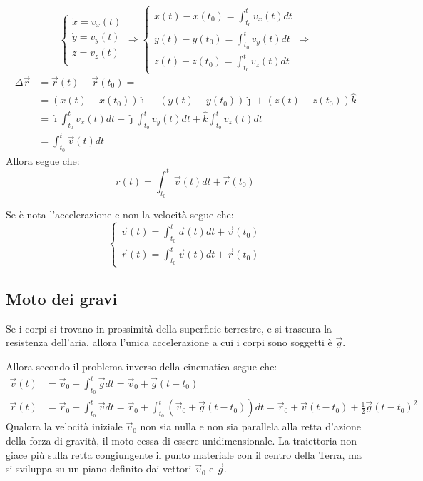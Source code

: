 \documentclass[11pt, a4paper, openright]{book}
\theoremstyle{plain}
\theoremstyle{definition}
\begin{document}
\[\begin{cases}
    \dot{x} = v_x(t) \\
    \dot{y} = v_y(t) \\
    \dot{z} = v_z(t) \\
\end{cases} \Rightarrow \begin{cases}
    \displaystyle x(t) - x(t_0) = \int_{t_0}^t v_x(t) dt \\[1em]
    \displaystyle y(t) - y(t_0) = \int_{t_0}^t v_y(t) dt \\[1em]
    \displaystyle z(t) - z(t_0) = \int_{t_0}^t v_z(t) dt 
\end{cases} \Rightarrow \]
\begin{align}
    \Delta \vec{r} & = \vec{r}(t) - \vec{r}(t_0) = \\
    & = (x(t) - x(t_0))\hat{\imath} + (y(t) - y(t_0))\hat{\jmath} + (z(t) - z(t_0))\hat{k} \\
    & = \hat{\imath}\int_{t_0}^t v_x(t)dt +  \hat{\jmath}\int_{t_0}^t v_y(t)dt + \hat{k}\int_{t_0}^t v_z(t)dt \\
    & = \int_{t_0}^t \vec{v}(t) dt
\end{align}
Allora segue che:
\[r(t) = \int_{t_0}^t \vec{v}(t) dt + \vec{r}(t_0)\]

Se è nota l'accelerazione e non la velocità segue che:
\[
\begin{cases}
    \vec{v}(t) = \displaystyle \int_{t_0}^t \vec{a}(t) dt + \vec{v}(t_0) \\[1em]
    
    \vec{r}(t) = \displaystyle \int_{t_0}^t \vec{v}(t) dt + \vec{r}(t_0)
\end{cases}
\]

\newpage
\subsection{Moto dei gravi}
Se i corpi si trovano in prossimità della superficie terrestre, e si trascura la resistenza dell'aria, allora l'unica accelerazione a cui i corpi sono soggetti è $\vec{g}$.

Allora secondo il problema inverso della cinematica segue che:
\begin{align}
    \vec{v}(t) & = \vec{v}_0 + \int_{t_0}^t \vec{g} dt = \vec{v}_0 + \vec{g}(t - t_0) \\
    \vec{r}(t) & = \vec{r}_0 + \int_{t_0}^t \vec{v} dt = \vec{r}_0 + \int_{t_0}^t (\vec{v}_0 + \vec{g}(t - t_0)) dt = \vec{r}_0 + \vec{v}(t - t_0) + \frac{1}{2}\vec{g}(t - t_0)^2
\end{align}
Qualora la velocità iniziale $\vec{v}_0$ non sia nulla e non sia parallela alla retta d'azione della forza di gravità, il moto cessa di essere unidimensionale. La traiettoria non giace più sulla retta congiungente il punto materiale con il centro della Terra, ma si sviluppa su un piano definito dai vettori $\vec{v}_0$ e $\vec{g}$.
\end{document}
